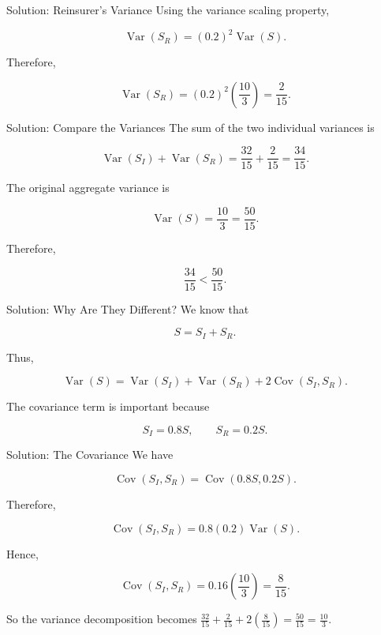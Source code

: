 \documentclass[
  ignorenonframetext,
  aspectratio=169,
]{beamer}
\begin{document}
\begin{frame}{Solution: Reinsurer's Variance}
\protect{}\label{solution-reinsurers-variance}
Using the variance scaling property,

\[
\operatorname{Var}(S_R)
=
(0.2)^2\operatorname{Var}(S).
\]

Therefore,

\[
\operatorname{Var}(S_R)
=
(0.2)^2\left(\frac{10}{3}\right)
=
\boxed{\frac{2}{15}}.
\]
\end{frame}

\begin{frame}{Solution: Compare the Variances}
\protect{}\label{solution-compare-the-variances}
The sum of the two individual variances is

\[
\operatorname{Var}(S_I)+\operatorname{Var}(S_R)
=
\frac{32}{15}+\frac{2}{15}
=
\boxed{\frac{34}{15}}.
\]

The original aggregate variance is

\[
\operatorname{Var}(S)=\frac{10}{3}
=\frac{50}{15}.
\]

Therefore,

\[
\boxed{
\frac{34}{15}<\frac{50}{15}
}.
\]
\end{frame}

\begin{frame}{Solution: Why Are They Different?}
\protect{}\label{solution-why-are-they-different}
We know that

\[
S=S_I+S_R.
\]

Thus,

\[
\operatorname{Var}(S)
=
\operatorname{Var}(S_I)
+
\operatorname{Var}(S_R)
+
2\operatorname{Cov}(S_I,S_R).
\]

The covariance term is important because

\[
S_I=0.8S,
\qquad
S_R=0.2S.
\]
\end{frame}

\begin{frame}{Solution: The Covariance}
\protect{}\label{solution-the-covariance}
We have

\[
\operatorname{Cov}(S_I,S_R)
=
\operatorname{Cov}(0.8S,0.2S).
\]

Therefore,

\[
\operatorname{Cov}(S_I,S_R)
=
0.8(0.2)\operatorname{Var}(S).
\]

Hence,

\[
\operatorname{Cov}(S_I,S_R)
=
0.16\left(\frac{10}{3}\right)
=
\boxed{\frac{8}{15}}.
\]

So the variance decomposition becomes
\(\frac{32}{15}+\frac{2}{15}+2\left(\frac{8}{15}\right)=\frac{50}{15}=\frac{10}{3}.\)
\end{frame}
\end{document}
